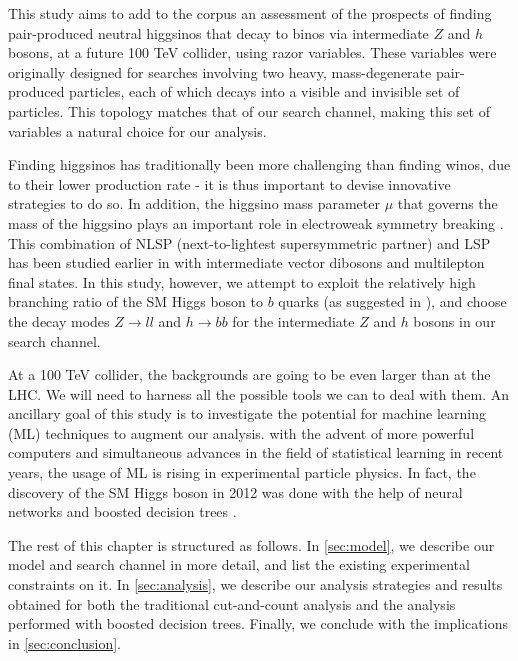 This study aims to add to the corpus an assessment of the prospects of finding pair-produced neutral higgsinos that decay to binos via intermediate $Z$ and $h$ bosons, at a future 100 TeV collider, using razor variables. These variables \citep{Rogan:2010kb} were originally designed for searches involving two heavy, mass-degenerate pair-produced particles, each of which decays into a visible and invisible set of particles. This topology matches that of our search channel, making this set of variables a natural choice for our analysis.

Finding higgsinos has traditionally been more challenging than finding winos, due to their lower production rate - it is thus important to devise innovative strategies to do so. In addition, the higgsino mass parameter $\mu$ that governs the mass of the higgsino plays an important role in electroweak symmetry breaking \citep{Acharya:2014pua}. This combination of NLSP (next-to-lightest supersymmetric partner) and LSP has been studied earlier in \citep{Gori:2014oua} with intermediate vector dibosons and multilepton final states. In this study, however, we attempt to exploit the relatively high branching ratio of the SM Higgs boson to $b$ quarks (as suggested in \cite{Han:2013kza}), and choose the decay modes $Z\rightarrow ll$ and $h\rightarrow bb$ for the intermediate $Z$ and $h$ bosons in our search channel.  

At a 100 TeV collider, the backgrounds are going to be even larger than at the LHC. We will need to harness all the possible tools we can to deal with them. An ancillary goal of this study is to investigate the potential for machine learning (ML) techniques to augment our analysis. with the advent of more powerful computers and simultaneous advances in the field of statistical learning in recent years, the usage of ML is rising in experimental particle physics. In fact, the discovery of the SM Higgs boson in 2012 was done with the help of neural networks \citep{Aad:2012tfa2012} and boosted decision trees \citep{Chatrchyan:2012xdj}.

The rest of this chapter is structured as follows. In \autoref{sec:model}, we describe our model and search channel in more detail, and list the existing experimental constraints on it. In \autoref{sec:analysis}, we describe our analysis strategies and results obtained for both the traditional cut-and-count analysis and the analysis performed with boosted decision trees. Finally, we conclude with the implications in \autoref{sec:conclusion}.


